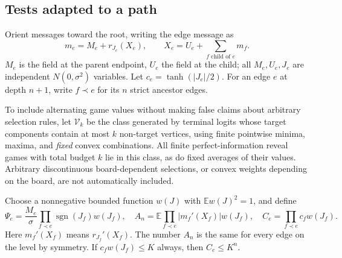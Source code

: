 \documentclass[11pt]{article}
\theoremstyle{definition}
\theoremstyle{remark}
\DeclareMathOperator{\sgn}{sgn}
\newcommand{\E}{\mathbb E}
\newcommand{\Vcl}{\mathcal V}
\begin{document}
\subsection{Tests adapted to a path}
Orient messages toward the root, writing the edge message as
\[
 m_e=M_e+r_{J_e}(X_e),\qquad
 X_e=U_e+\sum_{f\text{ child of }e}m_f.
\]
$M_e$ is the field at the parent endpoint, $U_e$ the field at the child;
all $M_e,U_e,J_e$ are independent $N(0,\sigma^2)$ variables.
Let $c_e=\tanh(|J_e|/2)$. For an edge $e$ at depth $n+1$, write $f\prec e$
for its $n$ strict ancestor edges.

To include alternating game values without making false claims about
arbitrary selection rules, let $\Vcl_k$ be the class generated by terminal
logits whose target components contain at most $k$ non-target vertices,
using finite pointwise minima, maxima, and \emph{fixed} convex combinations.
All finite perfect-information reveal games with total budget $k$ lie in
this class, as do fixed averages of their values. Arbitrary discontinuous
board-dependent selections, or convex weights depending on the board, are
not automatically included.

Choose a nonnegative bounded function $w(J)$ with $\E w(J)^2=1$, and define
\[
 \Psi_e=\frac{M_e}{\sigma}\prod_{f\prec e}\sgn(J_f)w(J_f),\quad
 A_n=\E\prod_{f\prec e}|m_f'(X_f)|w(J_f),\quad
 C_e=\prod_{f\prec e}c_fw(J_f).
\]
Here $m_f'(X_f)$ means $r_{J_f}'(X_f)$. The number $A_n$ is the same for
every edge on the level by symmetry. If $c_fw(J_f)\le K$ always, then
$C_e\le K^n$.
\end{document}
